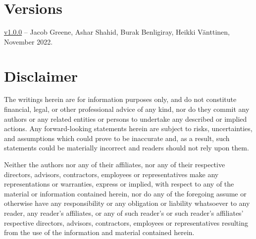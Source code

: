 \documentclass[11pt]{article}
\begin{document}
\small



\normalsize
\appendix
\section{Versions}
\label{sec:versions}
\href{https://github.com/api3dao/oev-litepaper/releases/tag/v1.0.0}{v1.0.0} -- Jacob Greene, Ashar Shahid, Burak Benligiray, Heikki Vänttinen, November 2022.

\section{Disclaimer}
\label{sec:disclaimer}

The writings herein are for information purposes only, and do not constitute financial, legal, or other professional advice of any kind, nor do they commit any authors or any related entities or persons to undertake any described or implied actions.
Any forward-looking statements herein are subject to risks, uncertainties, and assumptions which could prove to be inaccurate and, as a result, such statements could be materially incorrect and readers should not rely upon them.

Neither the authors nor any of their affiliates, nor any of their respective directors, advisors, contractors, employees or representatives make any representations or warranties, express or implied, with respect to any of the material or information contained herein, nor do any of the foregoing assume or otherwise have any responsibility or any obligation or liability whatsoever to any reader, any reader's affiliates, or any of such reader's or such reader's affiliates' respective directors, advisors, contractors, employees or representatives resulting from the use of the information and material contained herein.
\end{document}

